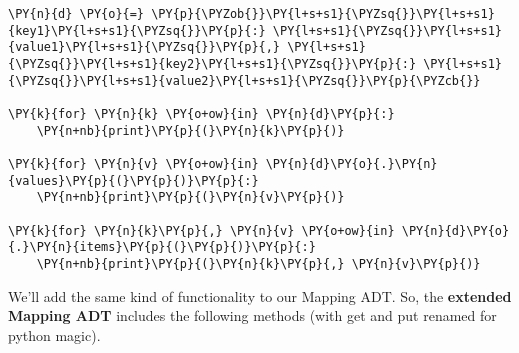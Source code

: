\begin{Verbatim}[commandchars=\\\{\}]
\PY{n}{d} \PY{o}{=} \PY{p}{\PYZob{}}\PY{l+s+s1}{\PYZsq{}}\PY{l+s+s1}{key1}\PY{l+s+s1}{\PYZsq{}}\PY{p}{:} \PY{l+s+s1}{\PYZsq{}}\PY{l+s+s1}{value1}\PY{l+s+s1}{\PYZsq{}}\PY{p}{,} \PY{l+s+s1}{\PYZsq{}}\PY{l+s+s1}{key2}\PY{l+s+s1}{\PYZsq{}}\PY{p}{:} \PY{l+s+s1}{\PYZsq{}}\PY{l+s+s1}{value2}\PY{l+s+s1}{\PYZsq{}}\PY{p}{\PYZcb{}}

\PY{k}{for} \PY{n}{k} \PY{o+ow}{in} \PY{n}{d}\PY{p}{:}
    \PY{n+nb}{print}\PY{p}{(}\PY{n}{k}\PY{p}{)}

\PY{k}{for} \PY{n}{v} \PY{o+ow}{in} \PY{n}{d}\PY{o}{.}\PY{n}{values}\PY{p}{(}\PY{p}{)}\PY{p}{:}
    \PY{n+nb}{print}\PY{p}{(}\PY{n}{v}\PY{p}{)}

\PY{k}{for} \PY{n}{k}\PY{p}{,} \PY{n}{v} \PY{o+ow}{in} \PY{n}{d}\PY{o}{.}\PY{n}{items}\PY{p}{(}\PY{p}{)}\PY{p}{:}
    \PY{n+nb}{print}\PY{p}{(}\PY{n}{k}\PY{p}{,} \PY{n}{v}\PY{p}{)}
\end{Verbatim}



We'll add the same kind of functionality to our Mapping ADT.  So, the \textbf{extended Mapping ADT} includes the following methods (with get and put renamed for python magic).

